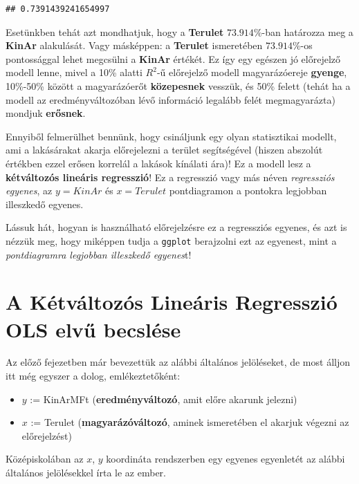 \documentclass[
]{book}
\providecommand{\tightlist}{%
  \setlength{\itemsep}{0pt}\setlength{\parskip}{0pt}}
\begin{document}
\begin{verbatim}
## 0.7391439241654997
\end{verbatim}

Esetünkben tehát azt mondhatjuk, hogy a \textbf{Terulet} \(73.914\%\)-ban határozza meg a \textbf{KinAr} alakulását. Vagy másképpen: a \textbf{Terulet} ismeretében \(73.914\%\)-os pontossággal lehet megcsülni a \textbf{KinAr} értékét. Ez így egy egészen jó előrejelző modell lenne, mivel a 10\% alatti \(R^2\)-ű előrejelző modell magyarázóereje \textbf{gyenge}, 10\%-50\% között a magyarázóerőt \textbf{közepesnek} vesszük, és 50\% felett (tehát ha a modell az eredményváltozóban lévő információ legalább felét megmagyarázta) mondjuk \textbf{erősnek}.

Ennyiből felmerülhet bennünk, hogy csináljunk egy olyan statisztikai modellt, ami a lakásárakat akarja előrejelezni a terület segítségével (hiszen abszolút értékben ezzel erősen korrelál a lakások kínálati ára)! Ez a modell lesz a \textbf{kétváltozós lineáris regresszió}! Ez a regresszió vagy más néven \emph{regressziós egyenes}, az \(y=KinAr\) és \(x=Terulet\) pontdiagramon a pontokra legjobban illeszkedő egyenes.

Lássuk hát, hogyan is használható előrejelzésre ez a regressziós egyenes, és azt is nézzük meg, hogy miképpen tudja a \texttt{ggplot} berajzolni ezt az egyenest, mint a \emph{pontdiagramra legjobban illeszkedő egyenes}t!

\section{A Kétváltozós Lineáris Regresszió OLS elvű becslése}\label{a-kuxe9tvuxe1ltozuxf3s-lineuxe1ris-regressziuxf3-ols-elvux171-becsluxe9se}

Az előző fejezetben már bevezettük az alábbi általános jelöléseket, de most álljon itt még egyszer a dolog, emlékeztetőként:

\begin{itemize}
\tightlist
\item
  \(y\) := KinArMFt (\textbf{eredményváltozó}, amit előre akarunk jelezni)
\item
  \(x\) := Terulet (\textbf{magyarázóváltozó}, aminek ismeretében el akarjuk végezni az előrejelzést)
\end{itemize}

Középiskolában az \(x\), \(y\) koordináta rendszerben egy egyenes egyenletét az alábbi általános jelölésekkel írta le az ember.
\end{document}
